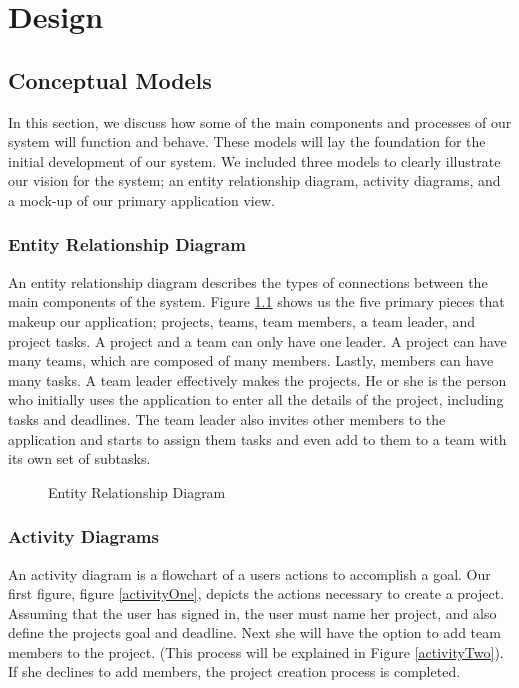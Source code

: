 \chapter{Design}

\section{Conceptual Models}
In this section, we discuss how some of the main components and processes of our system will function and behave. These models will lay the foundation for the initial development of our system. We included three models to clearly illustrate our vision for the system; an entity relationship diagram, activity diagrams, and a mock-up of our primary application view.
\subsection{Entity Relationship Diagram}
An entity relationship diagram describes the types of connections between the main components of the system. Figure \ref{erd} shows us the five primary pieces that makeup our application; projects, teams, team members, a team leader, and project tasks. A project and a team can only have one leader. A project can have many teams, which are composed of many members. Lastly, members can have many tasks. 
A team leader effectively makes the projects. He or she is the person who initially uses the application to enter all the details of the project, including tasks and deadlines. The team leader also invites other members to the application and starts to assign them tasks and even add to them to a team with its own set of subtasks. 
\begin{figure}[ht]
\centering
{}
\caption{Entity Relationship Diagram}
\label{erd}
\end{figure}
\FloatBarrier

\subsection{Activity Diagrams}
An activity diagram is a flowchart of a user\textsc{}s actions to accomplish a goal. Our first figure, figure \ref{activityOne}, depicts the actions necessary to create a project. Assuming that the user has signed in, the user must name her project, and also define the project\textsc{}s goal and deadline. Next she will have the option to add team members to the project. (This process will be explained in Figure \ref{activityTwo}).  If she declines to add members, the project creation process is completed. 

